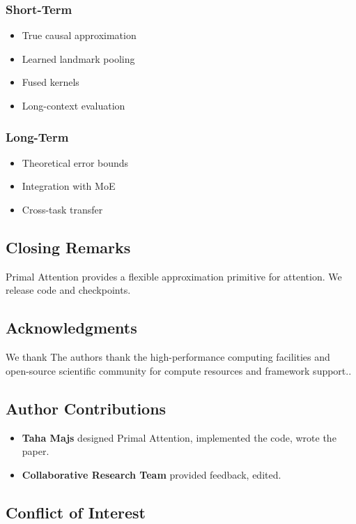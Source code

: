 \subsubsection{Short-Term}
\begin{itemize}
\item True causal approximation
\item Learned landmark pooling
\item Fused kernels
\item Long-context evaluation

\end{itemize}
\subsubsection{Long-Term}
\begin{itemize}
\item Theoretical error bounds
\item Integration with MoE
\item Cross-task transfer

\end{itemize}
\subsection{Closing Remarks}

Primal Attention provides a flexible approximation primitive for attention. 
We release code and checkpoints.

\subsection{Acknowledgments}

We thank The authors thank the high-performance computing facilities and open-source scientific community for compute resources and framework support..

\subsection{Author Contributions}

\begin{itemize}
\item \textbf{Taha Majs} designed Primal Attention, implemented the code, wrote the paper.
\item \textbf{Collaborative Research Team} provided feedback, edited.

\end{itemize}
\subsection{Conflict of Interest}

